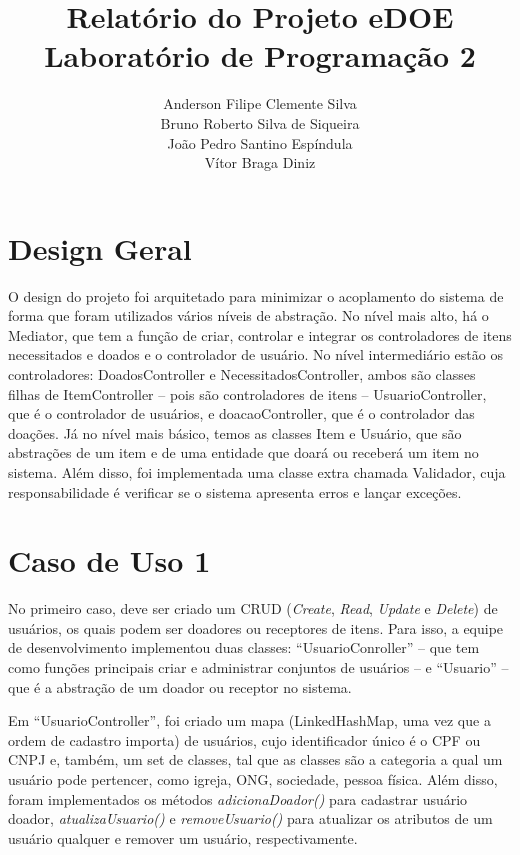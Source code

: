\documentclass[journal,12pt,onecolumn,draftclsnofoot,]{article}
\begin{document}
	
	\title{Relatório do Projeto eDOE \\ Laboratório de Programação 2}
	\author{Anderson Filipe Clemente Silva \\
			Bruno Roberto Silva de Siqueira \\
			João Pedro Santino Espíndula \\
			Vítor Braga Diniz}
	
	\maketitle
	\newpage
	
	\tableofcontents
	
	\newpage
	
	\section{Design Geral}
	O design do projeto foi arquitetado para minimizar o acoplamento do sistema de forma que foram utilizados vários níveis de abstração. No nível mais alto, há o Mediator, que tem a função de criar, controlar e integrar os controladores de itens necessitados e doados e o controlador de usuário. No nível intermediário estão os controladores: DoadosController e NecessitadosController, ambos são classes filhas de ItemController -- pois são controladores de itens -- UsuarioController, que é o controlador de usuários, e doacaoController, que é o controlador das doações. Já no nível mais básico, temos as classes Item e Usuário, que são abstrações de um item e de uma entidade que doará ou receberá um item no sistema. Além disso, foi implementada uma classe extra chamada Validador, cuja responsabilidade é verificar se o sistema apresenta erros e lançar exceções. 
	
	\section{Caso de Uso 1}
	No primeiro caso, deve ser criado um CRUD (\textit{Create}, \textit{Read}, \textit{Update} e \textit{Delete}) de usuários, os quais podem ser doadores ou receptores de itens. Para isso, a equipe de desenvolvimento implementou duas classes: “UsuarioConroller” -- que tem como funções principais criar e administrar conjuntos de usuários -- e “Usuario” -- que é a abstração de um doador ou receptor no sistema.
	
	Em “UsuarioController”,  foi criado um mapa (LinkedHashMap, uma vez que a ordem de cadastro importa) de usuários, cujo identificador único é o CPF ou CNPJ e, também, um set de classes, tal que as classes são a categoria a qual um usuário pode pertencer, como igreja, ONG, sociedade, pessoa física. Além disso, foram implementados os métodos \textit{adicionaDoador()} para cadastrar usuário doador, \textit{atualizaUsuario()} e \textit{removeUsuario()} para atualizar os atributos de um usuário qualquer e remover um usuário, respectivamente.
	
\end{document}
